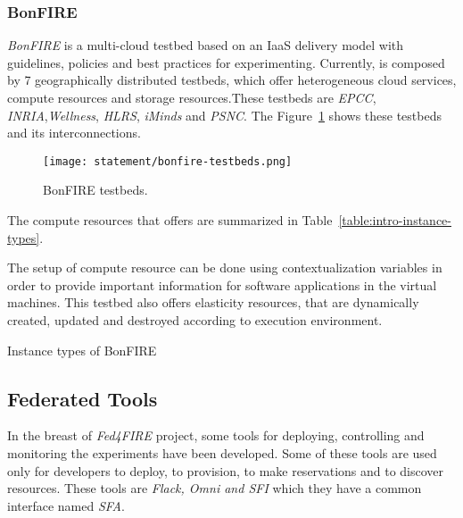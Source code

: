 \subsubsection{BonFIRE}

\emph{BonFIRE} is a multi-cloud testbed based on an \ac{IaaS}
delivery model with guidelines, policies and best practices for
experimenting. Currently, \bonfire is composed by 7 geographically distributed
testbeds, which offer heterogeneous cloud services, compute resources and
storage resources.These testbeds are \emph{EPCC},\emph{ INRIA},\emph{Wellness},\emph{ HLRS}, \emph{iMinds} and \emph{PSNC}. The Figure~\ref{fig:intr-bonfire-testbeds} shows these testbeds and its interconnections.

\begin{figure}[!h]
\begin{center}
\texttt{[image: statement/bonfire-testbeds.png]}
\caption{BonFIRE testbeds.}
\label{fig:intr-bonfire-testbeds}
\end{center}
\end{figure}

The compute resources that \bonfire offers are summarized in Table~\ref{table:intro-instance-types}.



The setup of compute resource can be done using contextualization variables in
order to provide important information for software applications in the virtual
machines. 
This testbed also offers elasticity resources, that are dynamically created,
updated and destroyed according to execution environment.

\begin{table}[H]
  \centering
  {\small
  
  }
  \caption{Instance types of BonFIRE}
  \label{table:intro-instance-types}
\end{table}


\subsection{Federated Tools}
\label{subsec:federatedtools}
In the breast of \emph{Fed4FIRE} project, some tools for deploying, controlling and
monitoring the experiments have been developed. 
Some of these tools are used only for developers to deploy, to provision, to
make reservations and to discover resources. These tools are \emph{Flack, Omni
  and SFI} which they have a common interface named \emph{SFA}.

